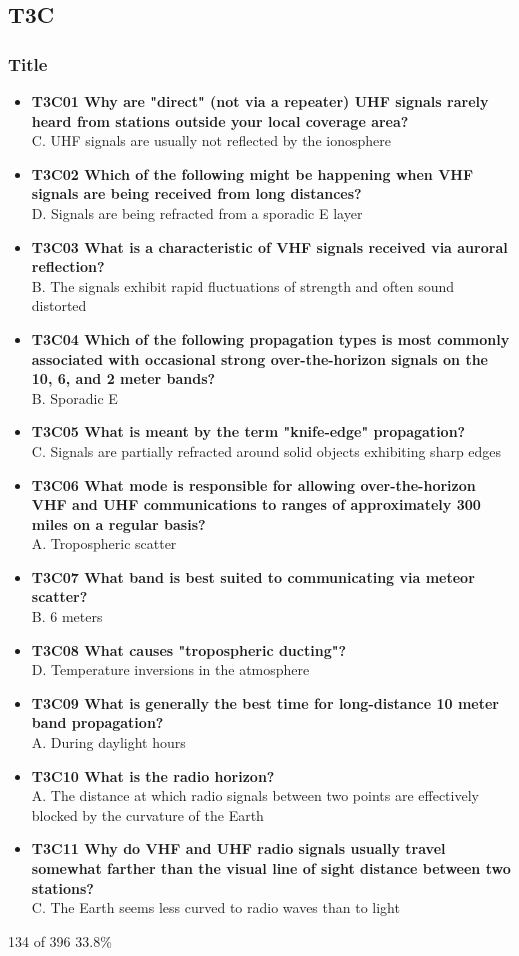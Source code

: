 \documentclass[10pt]{beamer}
\begin{document}
\subsection{T3C}
\begin{frame}
\frametitle{Title}
\begin{itemize}[<+->]
\tiny
\item\textbf{T3C01 Why are "direct" (not via a repeater) UHF signals rarely heard from stations outside your local coverage area?}\\ C. UHF signals are usually not reflected by the ionosphere
\item\textbf{T3C02 Which of the following might be happening when VHF signals are being received from long distances?}\\ D. Signals are being refracted from a sporadic E layer
\item\textbf{T3C03 What is a characteristic of VHF signals received via auroral reflection?}\\ B. The signals exhibit rapid fluctuations of strength and often sound distorted
\item\textbf{T3C04 Which of the following propagation types is most commonly associated with occasional strong over-the-horizon signals on the 10, 6, and 2 meter bands?}\\ B. Sporadic E
\item\textbf{T3C05 What is meant by the term "knife-edge" propagation?}\\ C. Signals are partially refracted around solid objects exhibiting sharp edges
\item\textbf{T3C06 What mode is responsible for allowing over-the-horizon VHF and UHF communications to ranges of approximately 300 miles on a regular basis?}\\ A. Tropospheric scatter
\item\textbf{T3C07 What band is best suited to communicating via meteor scatter?}\\ B. 6 meters
\item\textbf{T3C08 What causes "tropospheric ducting"?}\\ D. Temperature inversions in the atmosphere
\item\textbf{T3C09 What is generally the best time for long-distance 10 meter band propagation?}\\ A. During daylight hours
\item\textbf{T3C10 What is the radio horizon?}\\ A. The distance at which radio signals between two points are effectively blocked by the curvature of the Earth
\item\textbf{T3C11 Why do VHF and UHF radio signals usually travel somewhat farther than the visual line of sight distance between two stations?}\\ C. The Earth seems less curved to radio waves than to light
\end{itemize}
\tiny 134 of 396 33.8\%
\end{frame}
\end{document}
